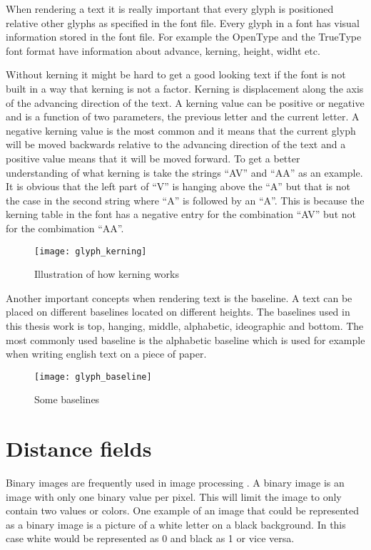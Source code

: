 When rendering a text it is really important that every glyph is positioned relative other glyphs as specified in the font file. Every glyph in a font has visual information stored in the font file. For example the OpenType and the TrueType\texttrademark{} font format have information about advance, kerning, height, widht etc\citep{OpenType, TrueType}.

Without kerning it might be hard to get a good looking text if the font is not built in a way that kerning is not a factor. Kerning is displacement along the axis of the advancing direction of the text. A kerning value can be positive or negative and is a function of two parameters, the previous letter and the current letter. A negative kerning value is the most common and it means that the current glyph will be moved backwards relative to the advancing direction of the text and a positive value means that it will be moved forward. To get a better understanding of what kerning is take the strings ``AV'' and ``AA'' as an example. It is obvious that the left part of ``V'' is hanging above the ``A'' but that is not the case in the second string where ``A'' is followed by an ``A''. This is because the kerning table in the font has a negative entry for the combination ``AV'' but not for the combimation ``AA''. \citep{FreeTypeKern}

\begin{figure}[H]
\texttt{[image: glyph\_kerning]}
\caption{Illustration of how kerning works}
\end{figure}

Another important concepts when rendering text is the baseline. A text can be placed on different baselines located on different heights. The baselines used in this thesis work is top, hanging, middle, alphabetic, ideographic and bottom. The most commonly used baseline is the alphabetic baseline which is used for example when writing english text on a piece of paper.

\begin{figure}[H]
\texttt{[image: glyph\_baseline]}
\caption{Some baselines}
\end{figure}

\section{Distance fields}\label{distancefield}
Binary images are frequently used in image processing \citep{Ragnemalm:1993}. A binary image is an image with only one binary value per pixel. This will limit the image to only contain two values or colors. One example of an image that could be represented as a binary image is a picture of a white letter on a black background. In this case white would be represented as 0 and black as 1 or vice versa.

